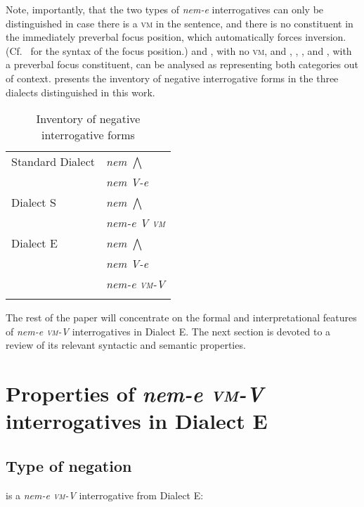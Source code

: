 \documentclass[output=paper,colorlinks,citecolor=brown]{langscibook}
\begin{document}
	Note, importantly, that the two types of \textit{nem-e} interrogatives can only be distinguished in case there is a \textsc{vm} in the sentence, and there is no constituent in the immediately preverbal focus position, which automatically forces inversion. (Cf.~\citealt{ekiss2002} for the syntax of the focus position.)  and , with no  \textsc{vm}, and  , , ,  and , with a preverbal focus constituent, can be analysed as representing both categories out of context.  presents the inventory of negative interrogative forms in the three dialects distinguished in this work.
	
\begin{table}
	\begin{tabular}{ll}
		\lsptoprule
		Standard Dialect & \textit{nem $\bigwedge$}\\
		& \textit{nem V-e}\\
		\midrule
		Dialect S & \textit{nem $\bigwedge$}\\
		&  \textit{nem-e V \textsc{vm}}\\
		\midrule
		Dialect E & \textit{nem $\bigwedge$} \\
		& \textit{nem V-e} \\
		& \textit{nem-e \textsc{vm}-V}\\
		\lspbottomrule
	\end{tabular}
	\caption{Inventory of negative interrogative forms}
\label{ex:summary}
\end{table}

	The rest of the paper will concentrate on the formal and interpretational features of \textit{nem-e \textsc{vm}-V} interrogatives  in Dialect E. The next section is devoted to a review of its relevant syntactic and semantic properties.
	
	
\section{Properties of \textit{nem-e \textsc{vm}-V} interrogatives in Dialect E}\label{sect:nem-e-dialect-e}
	
\subsection{Type of negation}\label{sect:type_negation}
	 is a \textit{nem-e \textsc{vm}-V} interrogative from Dialect E:
	
\end{document}
